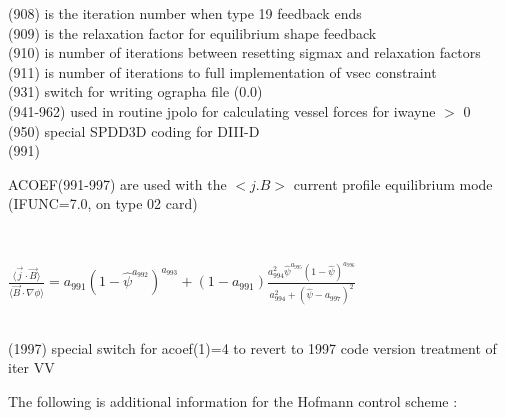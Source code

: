 \begin{tabbing}
(908) \> is the iteration number when type 19 feedback ends  \\
(909) \> is the relaxation factor for equilibrium shape feedback  \\
(910) \> is number of iterations between resetting sigmax and relaxation factors \\
(911) \> is number of iterations to full implementation of vsec constraint \\
(931) \> switch for writing ographa file (0.0) \\
(941-962) \> used in routine jpolo for calculating  vessel forces for iwayne $>$ 0 \\
(950) \> special SPDD3D coding for DIII-D \\
(991)\>  \parbox[t]{\width} {ACOEF(991-997) are used with the $<j.B>$ current
profile equilibrium mode (IFUNC=7.0, on type 02 card)} \\
\>  \parbox[t]{\width} {$ \frac{\langle \vec{j} \cdot \vec{B} \rangle}{\langle
\vec{B} \cdot \nabla \phi \rangle} = a_{991} (1 - \hat{\psi}^{a_{992}})^{a_{993}}
+ (1-a_{991}) \frac{a_{994}^{2} \hat{\psi}^{a_{995}} (1-\hat{\psi})^{a_{996}}}{a_{994}^{2} +
(\hat{\psi}-a_{997})^{2}}$} \\
(1997) \> special switch for acoef(1)=4 to revert to 1997 code version treatment of iter VV \\
\end{tabbing}
The following is additional information for the Hofmann control scheme :\\
